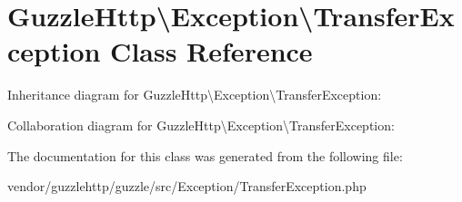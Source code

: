 \hypertarget{classGuzzleHttp_1_1Exception_1_1TransferException}{}\section{Guzzle\+Http\textbackslash{}Exception\textbackslash{}Transfer\+Exception Class Reference}
\label{classGuzzleHttp_1_1Exception_1_1TransferException}


Inheritance diagram for Guzzle\+Http\textbackslash{}Exception\textbackslash{}Transfer\+Exception\+:


Collaboration diagram for Guzzle\+Http\textbackslash{}Exception\textbackslash{}Transfer\+Exception\+:


The documentation for this class was generated from the following file\+:\begin{DoxyCompactItemize}
\item 
vendor/guzzlehttp/guzzle/src/\+Exception/Transfer\+Exception.\+php\end{DoxyCompactItemize}
